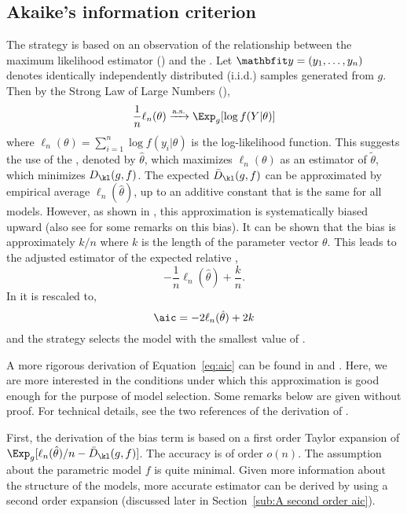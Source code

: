 \subsection{Akaike's information criterion}
\label{sub:Akaike's information criteria}

The \aic strategy is based on an observation of the relationship between the maximum likelihood estimator (\mle) and the \kld. Let $\data = (y_1,\dots,y_n)$ denotes identically independently distributed (i.i.d.) samples generated from $g$. Then by the Strong Law of Large Numbers (\slln),
\begin{equation}
  \frac{1}{n}\ell_n(\theta) \xrightarrow{\text{a.s.}} \Exp_g[\log f(Y|\theta)]
  \label{eq:ml convergence}
\end{equation}
where $\ell_n(\theta) = \sum_{i=1}^n \log f(y_i|\theta)$ is the log-likelihood function. This suggests the use of the \mle, denoted by $\hat\theta$, which maximizes $\ell_n(\theta)$ as an estimator of $\tilde\theta$, which minimizes $D_{\kl}(g,f)$. The expected \kld $\bar{D}_{\kl}(g,f)$ can be approximated by empirical average $\ell_n(\hat\theta)$, up to an additive constant that is the same for all models. However, as shown in \cite{Akaike:1973uc}, this approximation is systematically biased upward (also see \cite[][sec.~2.3]{Claeskens:2008tq} for some remarks on this bias). It can be shown that the bias is approximately $k/n$ where $k$ is the length of the parameter vector $\theta$. This leads to the adjusted estimator of the expected relative \kld,
\begin{equation}
  -\frac{1}{n}\ell_n(\hat\theta) + \frac{k}{n}.
\end{equation}
In \cite{Akaike:1973uc} it is rescaled to,
\begin{equation}
  \aic = -2\ell_n(\hat\theta) + 2k
  \label{eq:aic}
\end{equation}
and the \aic strategy selects the model with the smallest value of \aic.

A more rigorous derivation of Equation~\eqref{eq:aic} can be found in \cite[][sec.~2.3]{Claeskens:2008tq} and \cite[][sec.~6.2]{Burnham:2002wc}. Here, we are more interested in the conditions under which this approximation is good enough for the purpose of model selection. Some remarks below are given without proof. For technical details, see the two references of the derivation of \aic.

First, the derivation of the bias term is based on a first order Taylor expansion of $\Exp_g[\ell_n(\hat\theta)/n - \bar{D}_{\kl}(g,f)]$. The accuracy is of order $o(n)$. The assumption about the parametric model $f$ is quite minimal. Given more information about the structure of the models, more accurate estimator can be derived by using a second order expansion (discussed later in Section~\ref{sub:A second order aic}).

